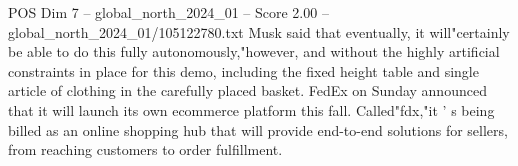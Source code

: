 \begin{textsample}{POS Dim 7 – global\_north\_2024\_01 – Score 2.00 – global\_north\_2024\_01/105122780.txt}
Musk said that eventually, it will"certainly be able to do this fully autonomously,"however, and without the highly artificial constraints in place for this demo, including the fixed height table and single article of clothing in the carefully placed basket.
FedEx on Sunday announced that it will launch its own ecommerce platform this fall.
Called"fdx,"it ' s being billed as an online shopping hub that will provide end-to-end solutions for sellers, from reaching customers to order fulfillment.

\end{textsample}
